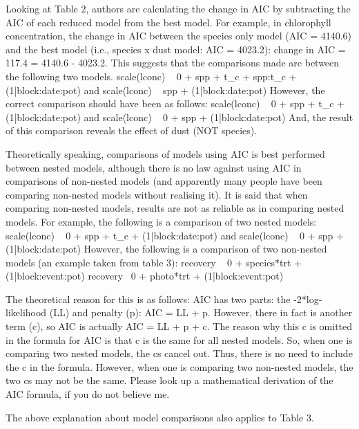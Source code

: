 \documentclass[parskip=half]{scrartcl}
\begin{document}
Looking at Table 2, authors are calculating the change in AIC by subtracting the AIC of each reduced model from the best model.
For example, in chlorophyll concentration, the change in AIC between the species only model (AIC = 4140.6) and the best model (i.e., species x dust model: AIC = 4023.2): change in AIC = 117.4 = 4140.6 - 4023.2.
This suggests that the comparisons made are between the following two models.
scale(lconc) ~ 0 + spp + t\_c + spp:t\_c + (1|block:date:pot) and
scale(lconc) ~ spp + (1|block:date:pot)
However, the correct comparison should have been as follows:
scale(lconc) ~ 0 + spp + t\_c + (1|block:date:pot) and
scale(lconc) ~ 0 + spp + (1|block:date:pot)
And, the result of this comparison reveals the effect of dust (NOT species).

Theoretically speaking, comparisons of models using AIC is best performed between nested models, although there is no law against using AIC in comparisons of non-nested models (and apparently many people have been comparing non-nested models without realising it). It is said that when comparing non-nested models, results are not as reliable as in comparing nested models.
For example, the following is a comparison of two nested models:
scale(lconc) ~ 0 + spp + t\_c + (1|block:date:pot) and
scale(lconc) ~ 0 + spp + (1|block:date:pot)
However, the following is a comparison of two non-nested models (an example taken from table 3):
recovery ~ 0 + species*trt + (1|block:event:pot)
recovery~ 0 + photo*trt + (1|block:event:pot)

The theoretical reason for this is as follows:
AIC has two parts: the -2*log-likelihood (LL) and penalty (p): AIC = LL + p.
However, there in fact is another term (c), so AIC is actually AIC = LL + p + c.
The reason why this c is omitted in the formula for AIC is that c is the same for all nested models.
So, when one is comparing two nested models, the cs cancel out. 
Thus, there is no need to include the c in the formula.
However, when one is comparing two non-nested models, the two cs may not be the same.
Please look up a mathematical derivation of the AIC formula, if you do not believe me.

The above explanation about model comparisons also applies to Table 3.
\end{document}
